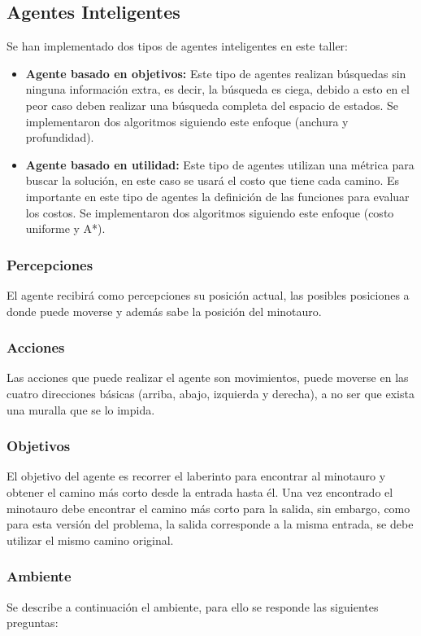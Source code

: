\documentclass[letter, titlepage, 10pt]{article}
\begin{document}
\subsection{Agentes Inteligentes}

Se han implementado dos tipos de agentes inteligentes en este taller:
\begin{itemize}
  \item{\textbf{Agente basado en objetivos: }} Este tipo de agentes realizan búsquedas sin ninguna información extra, es decir, la búsqueda es ciega, debido a esto en el peor caso deben realizar una búsqueda completa del espacio de estados. Se implementaron dos algoritmos siguiendo este enfoque (anchura y profundidad).
  \item{\textbf{Agente basado en utilidad: }}  Este tipo de agentes utilizan una métrica para buscar la solución, en este caso se usará el costo que tiene cada camino. Es importante en este tipo de agentes la definición de las funciones para evaluar los costos. Se implementaron dos algoritmos siguiendo este enfoque (costo uniforme y A*).
\end{itemize}

\subsubsection{Percepciones}
El agente recibirá como percepciones su posición actual, las posibles posiciones a donde puede moverse y además sabe la posición del minotauro. 

\subsubsection{Acciones}
Las acciones que puede realizar el agente son movimientos, puede moverse en las cuatro direcciones básicas (arriba, abajo, izquierda y derecha), a no ser que exista una muralla que se lo impida.

\subsubsection{Objetivos}
El objetivo del agente es recorrer el laberinto para encontrar al minotauro y obtener el camino más corto desde la entrada hasta él. Una vez encontrado el minotauro debe encontrar el camino más corto para la salida, sin embargo, como para esta versión del problema, la salida corresponde a la misma entrada, se debe utilizar el mismo camino original.

\subsubsection{Ambiente}
Se describe a continuación el ambiente, para ello se responde las siguientes preguntas:
\end{document}
